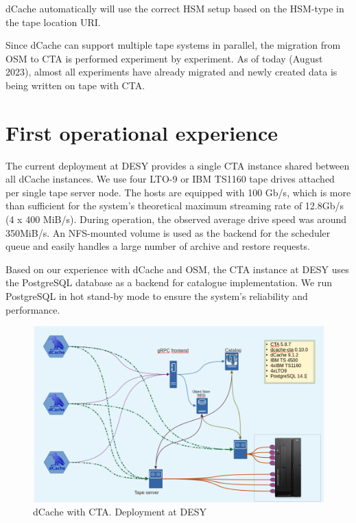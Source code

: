 \documentclass{webofc}
\begin{document}
dCache automatically will use the correct HSM setup based on the HSM-type in the tape location URI.

Since dCache can support multiple tape systems in parallel, the migration from OSM to CTA is performed experiment by experiment. As of today (August 2023), almost all experiments have already migrated and newly created data is being written on tape with CTA.

\section{First operational experience}
\label{experence}

The current deployment at DESY provides a single CTA instance shared between all dCache instances. We use four LTO-9 or IBM TS1160 tape drives attached per single tape server node. The hosts are equipped with 100 Gb/s, which is more than sufficient for the system's theoretical maximum streaming rate of 12.8Gb/s (4 x 400 MiB/s). During operation, the observed average drive speed was around 350MiB/s.  An NFS-mounted volume is used as the backend for the scheduler queue and easily handles a large number of archive and restore requests.

Based on our experience with dCache and OSM, the CTA instance at DESY uses the PostgreSQL database\cite{postgres} as a backend for catalogue implementation. We run PostgreSQL in hot stand-by mode to ensure the system's reliability and performance.

\begin{figure}[h]
    \centering
    \includegraphics[scale=0.30 ]{cta-deployment-desy.png}
    \caption{dCache with CTA. Deployment at DESY}
    \label{fig:dcache_cta_deplyment}
\end{figure}
\end{document}
